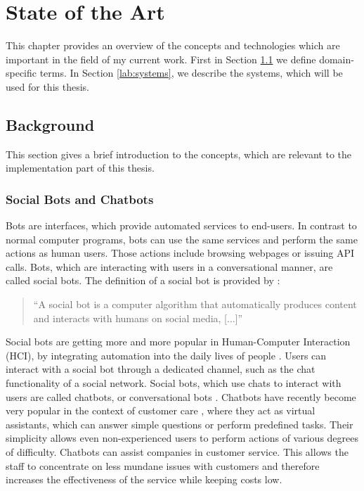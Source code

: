 \chapter{State of the Art}
This chapter provides an overview of the concepts and technologies which are important in the field of my current work. First in Section \ref{lab:background} we define domain-specific terms. In Section \ref{lab:systems}, we describe the systems, which will be used for this thesis.

\section{Background} \label{lab:background}

This section gives a brief introduction to the concepts, which are relevant to the implementation part of this thesis.

\subsection{Social Bots and Chatbots}
Bots are interfaces, which provide automated services to end-users.
In contrast to normal computer programs, bots can use the same services and perform the same actions as human users. Those actions include browsing webpages or issuing API calls.
Bots, which are interacting with users in a conversational manner, are called social bots.
The definition of a social bot is provided by \cite{FVD*16b}:
\begin{quote}
    ``A social bot is a computer algorithm that automatically produces content and interacts with humans on social media, [...]''
\end{quote}

Social bots are getting more and more popular in Human-Computer Interaction (HCI), by integrating automation into the daily lives of people \cite{BFPN17}. Users can interact with a social bot through a dedicated channel, such as the chat functionality of a social network.
Social bots, which use chats to interact with users are called chatbots, or conversational bots \cite{WWX*16,AAA17}.
Chatbots have recently become very popular in the context of customer care \cite{CHW*17,FVD*16b}, where they act as virtual assistants, which can answer simple questions \cite{CaWh14} or perform predefined tasks. Their simplicity allows even non-experienced users to perform actions of various degrees of difficulty. 
Chatbots can assist companies in customer service. This allows the staff to concentrate on less mundane issues with customers and therefore increases the effectiveness of the service while keeping costs low. \cite{AAA17}

